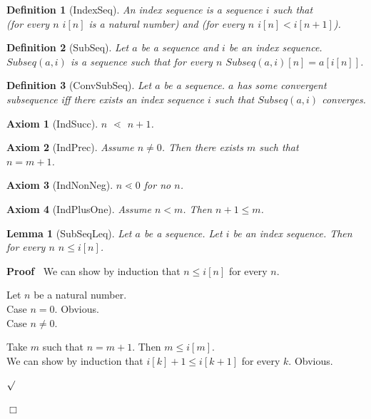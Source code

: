 \documentclass{article}
\newenvironment{forthel}{\begin{leftbar}}{\end{leftbar}}
\newenvironment{proof}{\noindent\textbf{Proof\ }}{\hspace*{\fill}$\Box$\medskip}
\newenvironment{subproof}{\begin{list}{}{}
		\item[\text{Proof}]}{\hfill $\surd$ \end{list}}
\newenvironment{case}{\begin{list}{}{}
		\item[]}{\end{list}}
\newtheorem{axiom}{Axiom}
\newtheorem{lemma}{Lemma}
\newtheorem{definition}{Definition}
\begin{document}
\begin{forthel}	
	\begin{definition}[IndexSeq]
		An index sequence is a sequence $i$ such that \\
		(for every $n$ $i[n]$ is a natural number) and (for every $n$ $i[n] < i[n + 1]$).
	\end{definition}
	
	\begin{definition}[SubSeq]
		Let $a$ be a sequence and $i$ be an index sequence. $Subseq(a,i)$ is a sequence such that for every $n$
		$Subseq(a,i)[n] = a[i[n]]$.
	\end{definition}
	
	\begin{definition}[ConvSubSeq]
		Let $a$ be a sequence. $a$ has some convergent subsequence iff there exists an index sequence $i$ such that $Subseq(a,i)$ converges.
	\end{definition}
	
	\begin{axiom}[IndSucc]
		$n$ $\lessdot$ $n + 1$. 
	\end{axiom}
	
	\begin{axiom}[IndPrec]
		Assume $n \neq 0$. Then there exists $m$ such that \\ $n = m + 1$.
	\end{axiom}
	
	\begin{axiom}[IndNonNeg]
		$n \lessdot 0$ for no $n$.
	\end{axiom}
	
	\begin{axiom}[IndPlusOne]
		Assume $n < m$. Then $n + 1 \leq m$.
	\end{axiom}
	
	\begin{lemma}[SubSeqLeq]
		Let $a$ be a sequence. Let $i$ be an index sequence. Then for every $n$ $n \leq i[n]$.
	\end{lemma}
	
	\begin{proof}
		We can show by induction that $n \leq i[n]$ for every $n$.
		\begin{subproof}
			Let $n$ be a natural number.\\
			Case $n = 0$. Obvious.\\
			Case $n \neq 0$.
			\begin{case}
				Take $m$ such that $n = m + 1$. Then $m \leq i[m]$.\\
				We can show by induction that $i[k] + 1 \leq i[k + 1]$ for every $k$. Obvious.
			\end{case}
		\end{subproof}
	\end{proof}
	

\end{forthel}
\end{document}
